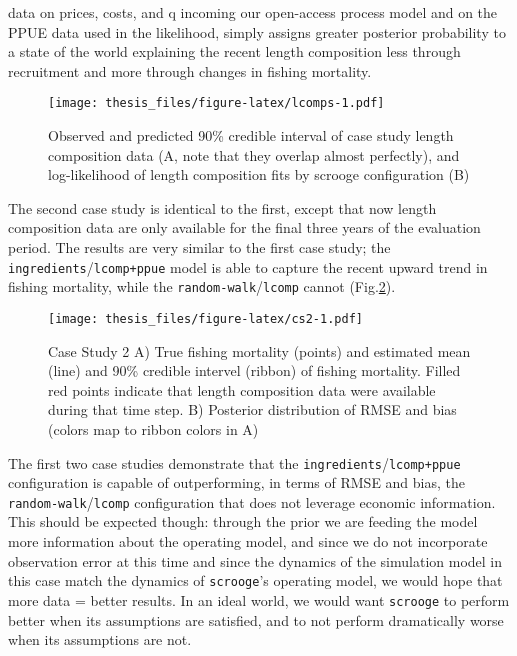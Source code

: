 \documentclass[twoside,12pt,final]{ucthesis-CA2012}
\begin{document}
\begin{ucmainmatter}
data on prices, costs, and q incoming our open-access process model and
on the PPUE data used in the likelihood, simply assigns greater
posterior probability to a state of the world explaining the recent
length composition less through recruitment and more through changes in
fishing mortality.
\begin{figure}
\centering
\texttt{[image: thesis\_files/figure-latex/lcomps-1.pdf]}
\caption{\label{fig:lcomps}Observed and predicted 90\% credible interval of
case study length composition data (A, note that they overlap almost
perfectly), and log-likelihood of length composition fits by scrooge
configuration (B)}
\end{figure}
The second case study is identical to the first, except that now length
composition data are only available for the final three years of the
evaluation period. The results are very similar to the first case study;
the \texttt{ingredients}/\texttt{lcomp+ppue} model is able to capture
the recent upward trend in fishing mortality, while the
\texttt{random-walk}/\texttt{lcomp} cannot (Fig.\ref{fig:cs2}).
\begin{figure}
\centering
\texttt{[image: thesis\_files/figure-latex/cs2-1.pdf]}
\caption{\label{fig:cs2}Case Study 2 A) True fishing mortality (points) and
estimated mean (line) and 90\% credible intervel (ribbon) of fishing
mortality. Filled red points indicate that length composition data were
available during that time step. B) Posterior distribution of RMSE and
bias (colors map to ribbon colors in A)}
\end{figure}
The first two case studies demonstrate that the
\texttt{ingredients}/\texttt{lcomp+ppue} configuration is capable of
outperforming, in terms of RMSE and bias, the
\texttt{random-walk}/\texttt{lcomp} configuration that does not leverage
economic information. This should be expected though: through the prior
we are feeding the model more information about the operating model, and
since we do not incorporate observation error at this time and since the
dynamics of the simulation model in this case match the dynamics of
\texttt{scrooge}'s operating model, we would hope that more data =
better results. In an ideal world, we would want \texttt{scrooge} to
perform better when its assumptions are satisfied, and to not perform
dramatically worse when its assumptions are not.


\end{ucmainmatter}
\end{document}
